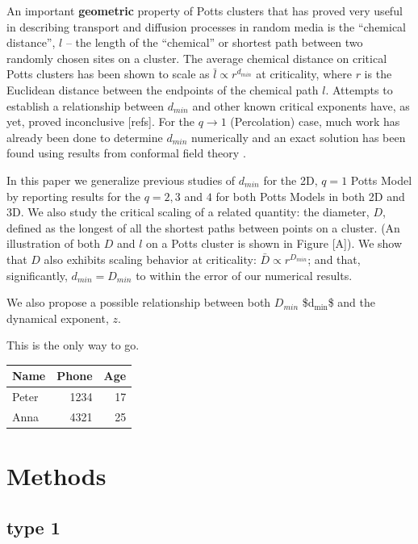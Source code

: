 \documentclass[aps, twocolumn, groupedaddress]{revtex4}
\begin{document}
An important \textbf{geometric} property of Potts clusters that has proved very useful in describing transport and diffusion processes in random media is the ``chemical distance'', $l$ -- the length of the ``chemical'' or shortest path between two randomly chosen sites on a cluster.  The average chemical distance on critical Potts clusters has been shown to scale as $\bar{l} \propto r^{d_{min}}$ at criticality, where $r$ is the Euclidean distance between the endpoints of the chemical path $l$. Attempts to establish a relationship between $d_{min}$ and other known critical exponents have, as yet, proved inconclusive [refs].  For the $q \to 1$ (Percolation) case, much work has already been done to determine $d_{min}$ numerically \cite{Gr83, HrSt88} and an exact solution has been found using results from conformal field theory \cite{Zi99}.
 
In this paper we generalize previous studies of $d_{min}$ for the 2D, $q=1$ Potts Model by reporting results for the $q = 2, 3$ and $4$ for both Potts Models in both 2D and 3D.  We also study the critical scaling of a related quantity: the diameter, $D$, defined as the longest of all the shortest paths between points on a cluster. (An illustration of both $D$ and $l$ on a Potts cluster is shown in Figure [A]).  We show that $D$ also exhibits scaling behavior at criticality: $\bar{D} \propto r^{D_{min}}$; and that, significantly, $d_{min} = D_{min}$ to within the error of our numerical results.  
 
We also propose a possible relationship between both $D_{min}$ \$d$_{\mathrm{min}}$\$ and the dynamical exponent, $z$.

This \cite{OsSo04} is the only way to go.


\begin{center}
\begin{tabular}{lrr}
 Name   &  Phone  &  Age  \\
\hline
 Peter  &   1234  &   17  \\
 Anna   &   4321  &   25  \\
\end{tabular}
\end{center}
\section{Methods}
\label{sec-2}
\subsection{type 1}
\label{sec-2.1}
\end{document}
